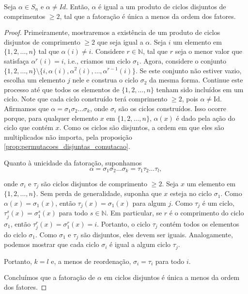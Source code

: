 \documentclass[11pt,openany]{book}
\newenvironment{novo}{
    \color{red}
}{}
\begin{document}
\begin{novo}

\begin{proposition}
\label{prop:fatoracao_ciclos_disjuntos}
    Seja $\alpha \in S_n$ e $\alpha \not= Id$. Então, $\alpha$ é igual a um produto de ciclos disjuntos de comprimentos $\geq 2$, tal que a fatoração é única a menos da ordem dos fatores.
\end{proposition}

\begin{proof}
    Primeiramente, mostraremos a existência de um produto de ciclos disjuntos de comprimento $\geq 2$ que seja igual a $\alpha$. 
    Seja $i$ um elemento em $\{1, 2, \ldots, n\}$ tal que $\alpha(i) \neq i$.
    Considere $r \in \mathbb{N}$, tal que $r$ seja o menor valor que satisfaça $\alpha^{r}(i) = i$, i.e., criamos um ciclo $\sigma_1$.
    Agora, considere o conjunto $\{1, 2, \dots, n\} \setminus \{i, \alpha(i), \alpha^2(i), \dots, \alpha^{r-1}(i)\}$. Se este conjunto não estiver vazio, escolha um elemento $j$ nele e construa o ciclo $\sigma_2$ da mesma forma. 
    Continue este processo até que todos os elementos de $\{1, 2, \dots, n\}$ tenham sido incluídos em um ciclo. Note que cada ciclo construído terá comprimento $\geq 2$, pois $\alpha \neq \text{Id}$. Afirmamos que $\alpha = \sigma_1 \sigma_2 \dots \sigma_k$, onde $\sigma_i$ são os ciclos construídos. 
    Isso ocorre porque, para qualquer elemento $x$ em $\{1, 2, \dots, n\}$, $\alpha(x)$ é dado pela ação do ciclo que contém $x$. Como os ciclos são disjuntos, a ordem em que eles são multiplicados não importa, pela proposição \ref{prop:permutacoes_disjuntas_comutacao}.
    
    Quanto à unicidade da fatoração, suponhamos
    \[\alpha = \sigma_1 \sigma_2 \dots \sigma_k = \tau_1 \tau_2 \dots \tau_l,\]

    onde $\sigma_i$ e $\tau_j$ são ciclos disjuntos de comprimento $\geq 2$. 
    Seja $x$ um elemento em $\{1, 2, \dots, n\}$.  Sem perda de generalidade, suponha que $x$ esteja no ciclo $\sigma_1$. 
    Como $\alpha(x) = \sigma_1(x)$, então $\tau_j(x) = \sigma_1(x)$ para algum $j$. 
    Como $\tau_j$ é um ciclo, $\tau_j^s(x) = \sigma_1^s(x)$ para todo $s \in \mathbb{N}$. 
    Em particular, se $r$ é o comprimento do ciclo $\sigma_1$, então $\tau_j^r(x) = \sigma_1^r(x) = i$. 
    Portanto, o ciclo $\tau_j$ contém todos os elementos do ciclo $\sigma_1$. 
    Como $\sigma_1$ e $\tau_j$ são disjuntos, eles devem ser iguais. 
    Analogamente, podemos mostrar que cada ciclo $\sigma_i$ é igual a algum ciclo $\tau_j$. 
    
    Portanto, $k = l$ e, a menos de reordenação, $\sigma_i = \tau_i$ para todo $i$. 

    Concluímos que a fatoração de $\alpha$ em ciclos disjuntos é única a menos da ordem dos fatores.
\end{proof}

\end{novo}
\end{document}
